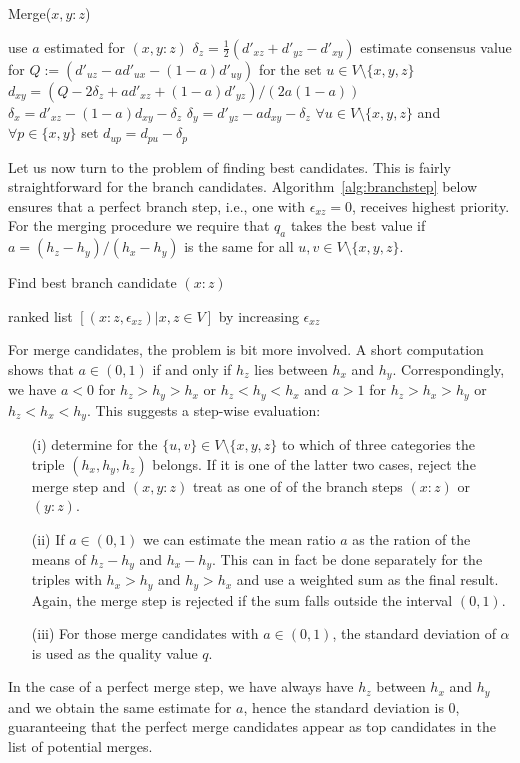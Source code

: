 \documentclass{article}
\begin{document}
\begin{algorithm}[H]
\caption{Merge($x,y:z$)} 
\label{alg:mergestep} 
\SetAlgoLined
use $a$ estimated for $(x,y:z)$\;
$\delta_z = \frac{1}{2}(d'_{xz}+d'_{yz}-d'_{xy})$\;
estimate consensus value for $Q:=(d'_{uz}-a d'_{ux}-(1-a) d'_{uy})$ for the 
set $u\in V\setminus\{x,y,z\}$\;
$d_{xy} = (Q-2 \delta_z + a d'_{xz}+(1-a) d'_{yz})/(2a(1-a))$\;
$\delta_x = d'_{xz} - (1-a) d_{xy} - \delta_z$\;
$\delta_y = d'_{yz} -   a   d_{xy} - \delta_z$\;
$\forall u\in V\setminus\{x,y,z\}$ and $\forall p\in\{x,y\}$ set   
$d_{up} = d_{pu} -\delta_p$\;
\end{algorithm} 

Let us now turn to the problem of finding best candidates. This is fairly
straightforward for the branch candidates. Algorithm~\ref{alg:branchstep}
below ensures that a perfect branch step, i.e., one with $\epsilon_{xz}=0$,
receives highest priority. For the merging procedure we require that $q_a$
takes the best value if $a=(h_z-h_y)/(h_x-h_y)$ is the same for all $u,v\in
V\setminus\{x,y,z\}$.

\begin{algorithm}[H]
\caption{Find best branch candidate $(x:z)$ } 
\label{alg:branchstep}
\SetAlgoLined
{}
\Return ranked list $[(x:z,\epsilon_{xz})| x,z\in V]$ by increasing 
$\epsilon_{xz}$\;
\end{algorithm} 

For merge candidates, the problem is bit more involved.  A short
computation shows that $a\in(0,1)$ if and only if $h_z$ lies between $h_x$
and $h_y$. Correspondingly, we have $a<0$ for $h_z>h_y>h_x$ or
$h_z<h_y<h_x$ and $a>1$ for $h_z>h_x>h_y$ or $h_z<h_x<h_y$.  This suggests
a step-wise evaluation:
\begin{itemize} 
\item[(i)] determine for the $\{u,v\}\in V\setminus\{x,y,z\}$ to which of
  three categories the triple $(h_x,h_y,h_z)$ belongs. If it is one of the
  latter two cases, reject the merge step and $(x,y:z)$ treat as one of of
  the branch steps $(x:z)$ or $(y:z)$.
\item[(ii)] If $a\in(0,1)$ we can estimate the mean ratio $a$ as the ration
  of the means of $h_z-h_y$ and $h_x-h_y$. This can in fact be done
  separately for the triples with $h_x>h_y$ and $h_y>h_x$ and use a
  weighted sum as the final result. Again, the merge step is rejected if
  the sum falls outside the interval $(0,1)$. 
\item[(iii)] For those merge candidates with $a\in(0,1)$, the standard
  deviation of $\alpha$ is used as the quality value $q$.
\end{itemize}
In the case of a perfect merge step, we have always have $h_z$ between
$h_x$ and $h_y$ and we obtain the same estimate for $a$, hence the standard
deviation is $0$, guaranteeing that the perfect merge candidates appear as
top candidates in the list of potential merges. 
\end{document}
